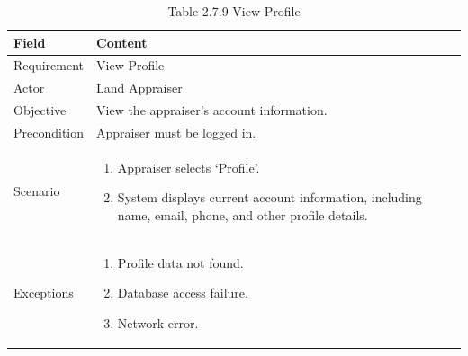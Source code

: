 \documentclass[12pt,oneside]{report}
\begin{document}
\begin{table}[H]
\centering
\caption{Table 2.7.9 View Profile}
\label{tab:req-view-profile}
\begin{tabularx}{\textwidth}{|p{3cm}|X|}
\hline
\textbf{Field} & \textbf{Content} \\ \hline

Requirement & View Profile \\ \hline

Actor & Land Appraiser \\ \hline

Objective & View the appraiser’s account information. \\ \hline

Precondition & Appraiser must be logged in. \\ \hline

Scenario & 
\begin{minipage}[t]{0.75\textwidth}
\begin{enumerate}[leftmargin=*,label=\arabic*.]
\item Appraiser selects ‘Profile’.
\item System displays current account information, including name, email, phone, and other profile details.
\end{enumerate}
\end{minipage} \\ \hline

Exceptions & 
\begin{minipage}[t]{0.75\textwidth}
\begin{enumerate}[leftmargin=*,label=\arabic*.]
\item Profile data not found.
\item Database access failure.
\item Network error.
\end{enumerate}
\end{minipage} \\ \hline
\end{tabularx}
\end{table}
\end{document}
